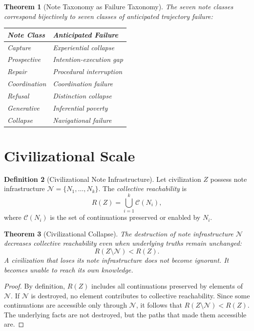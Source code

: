 \documentclass[12pt, a4paper, openany]{book}
\theoremstyle{plain}
\newtheorem{theorem}{Theorem}[chapter]
\theoremstyle{definition}
\newtheorem{definition}[theorem]{Definition}
\theoremstyle{remark}
\newcommand{\calC}{\mathcal{C}}
\newcommand{\calN}{\mathcal{N}}
\begin{document}
\begin{theorem}[Note Taxonomy as Failure Taxonomy]
The seven note classes correspond bijectively to seven classes of anticipated
trajectory failure:
\begin{center}
\begin{tabular}{ll}
\toprule
Note Class & Anticipated Failure \\
\midrule
Capture & Experiential collapse \\
Prospective & Intention-execution gap \\
Repair & Procedural interruption \\
Coordination & Coordination failure \\
Refusal & Distinction collapse \\
Generative & Inferential poverty \\
Collapse & Navigational failure \\
\bottomrule
\end{tabular}
\end{center}
\end{theorem}

\section{Civilizational Scale}

\begin{definition}[Civilizational Note Infrastructure]
Let civilization $Z$ possess note infrastructure $\calN = \{N_1, \ldots, N_k\}$.
The \emph{collective reachability} is
\[
R(Z) = \bigcup_{i=1}^{k} \calC(N_i),
\]
where $\calC(N_i)$ is the set of continuations preserved or enabled by $N_i$.
\end{definition}

\begin{theorem}[Civilizational Collapse]
The destruction of note infrastructure $\calN$ decreases collective reachability
even when underlying truths remain unchanged:
\[
R(Z \setminus \calN) < R(Z).
\]
A civilization that loses its note infrastructure does not become ignorant. It
becomes unable to reach its own knowledge.
\end{theorem}

\begin{proof}
By definition, $R(Z)$ includes all continuations preserved by elements of $\calN$.
If $\calN$ is destroyed, no element contributes to collective reachability. Since
some continuations are accessible only through $\calN$, it follows that
$R(Z \setminus \calN) < R(Z)$. The underlying facts are not destroyed, but the
paths that made them accessible are.
\end{proof}
\end{document}
